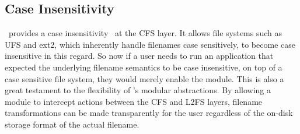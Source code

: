 

\subsection{Case Insensitivity}
\label{sec:modules:icase}
\Kudos\ provides a case insensitivity \module\ at the CFS layer. It 
allows file systems such as UFS and ext2, which inherently handle filenames 
case sensitively, to become case insensitive in this regard. So now if a user 
needs to run an application that expected the underlying filename semantics 
to be case insensitive, on top of a case sensitive file system, they would 
merely enable the module. This is also a great testament to the flexibility 
of \Kudos's modular abstractions. By allowing a module to intercept actions 
between the CFS and L2FS layers, filename transformations can be made  
transparently for the user regardless of the on-disk storage format of 
the actual filename.
